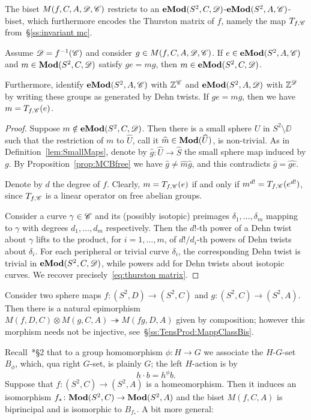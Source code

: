 \documentclass{amsart}
\begin{document}
The biset $M(f,C,A,\DD,\CC)$ restricts to an
$\Mod[e](S^2,C,\DD)$-$\Mod[e](S^2,A,\CC)$-biset, which furthermore
encodes the Thurston matrix of $f$, namely the map $T_{f,\CC}$
from~\S\ref{ss:invariant mc}.
\begin{prop}\label{prop:MCBedge}
  Assume $\DD=f^{-1}(\CC)$ and consider $g\in M(f,C,A,\DD,\CC)$.  If
  $e\in\Mod[e](S^2,A,\CC)$ and $m\in\Mod(S^2,C,\DD)$ satisfy $g e=m g$, then
  $m\in\Mod[e](S^2,C,\DD)$.

  Furthermore, identify $\Mod[e](S^2,A,\CC)$ with $\Z^\CC$ and
  $\Mod[e](S^2,A,\DD)$ with $\Z^\DD$ by writing these groups as generated
  by Dehn twists. If $g e = m g$, then we have $m=T_{f,\CC}(e)$.
\end{prop}
\begin{proof}
  Suppose $m\notin \Mod[e](S^2,C,\DD)$. Then there is a small sphere $U$
  in $S^2\setminus \DD$ such that the restriction of $m$ to $\widehat U$,
  call it $\widehat m\in \Mod(\widehat U)$, is non-trivial.  As in
  Definition~\ref{lem:SmallMaps}, denote by $\widehat g \colon \widehat U
  \to \widehat S$ the small sphere map induced by $g$. By
  Proposition~\ref{prop:MCBfree} we have $\widehat g\neq \widehat m\widehat
  g$, and this contradicts $\widehat g= \widehat{g e}$.

  Denote by $d$ the degree of $f$. Clearly, $m=T_{f,\CC}(e)$ if and only if
  $m^{d!}=T_{f,\CC}(e^{d!})$, since $T_{f,\CC}$ is a linear operator on
  free abelian groups.

  Consider a curve $\gamma\in\CC$ and its (possibly isotopic) preimages
  $\delta_1,\dots,\delta_m$ mapping to $\gamma$ with degrees
  $d_1,\dots,d_m$ respectively. Then the $d!$-th power of a Dehn twist
  about $\gamma$ lifts to the product, for $i=1,\dots,m$, of $d!/d_i$-th
  powers of Dehn twists about $\delta_i$. For each peripheral or trivial
  curve $\delta_i$, the corresponding Dehn twist is trivial in
  $\Mod[e](S^2,C,\DD)$, while powers add for Dehn twists about isotopic
  curves. We recover precisely~\eqref{eq:thurston matrix}.
\end{proof}

Consider two sphere maps $f\colon (S^2,D)\to (S^2,C)$ and
$g\colon (S^2,C)\to (S^2,A)$. Then there is a natural epimorphism
$M(f,D,C)\otimes M(g,C,A)\twoheadrightarrow M(f g,D,A)$ given by
composition; however this morphism needs not be injective,
see~\S\ref{ss:TensProd:MappClassBis}.

Recall~\cite{bartholdi-dudko:bc1}*{\S2} that to a group homomorphism
$\phi\colon H\to G$ we associate the $H$-$G$-set $B_\phi$, which, qua
right $G$-set, is plainly $G$; the left $H$-action is by
\[h\cdot b=h^\phi b.
\]
Suppose that $f\colon (S^2,C)\to (S^2,A)$ is a homeomorphism. Then it
induces an isomorphism $f_*\colon \Mod(S^2,C)\to \Mod(S^2,A)$ and the
biset $M(f,C,A)$ is biprincipal and is isomorphic to $B_{f_*}$. A bit
more general:
 
\end{document}
